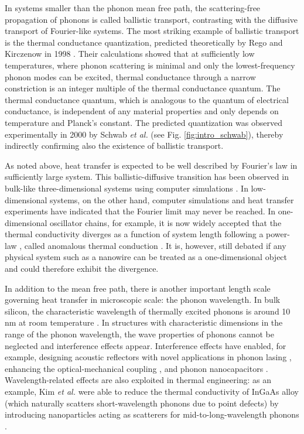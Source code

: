 In systems smaller than the phonon mean free path, the scattering-free propagation of phonons is called ballistic transport, contrasting with the diffusive transport of Fourier-like systems. The most striking example of ballistic transport is the thermal conductance quantization, predicted theoretically by Rego and Kirczenow in 1998 \cite{rego98}. Their calculations showed that at sufficiently low temperatures, where phonon scattering is minimal and only the lowest-frequency phonon modes can be excited, thermal conductance through a narrow constriction is an integer multiple of the thermal conductance quantum. The thermal conductance quantum, which is analogous to the quantum of electrical conductance, is independent of any material properties and only depends on temperature and Planck's constant. The predicted quantization was observed experimentally in 2000 by Schwab \textit{et al.} \cite{schwab00} (see Fig. \ref{fig:intro_schwab}), thereby indirectly confirming also the existence of ballistic transport.

As noted above, heat transfer is expected to be well described by Fourier's law in sufficiently large system. This ballistic-diffusive transition has been observed in bulk-like three-dimensional systems using computer simulations \cite{saito10}. In low-dimensional systems, on the other hand, computer simulations \cite{lepri97,lepri03,mai07,dhar08} and heat transfer experiments \cite{yang10,xu14} have indicated that the Fourier limit may never be reached. In one-dimensional oscillator chains, for example, it is now widely accepted \cite{dhar08} that the thermal conductivity diverges as a function of system length following a power-law \cite{mai07}, called anomalous thermal conduction \cite{dhar08}. It is, however, still debated \cite{marconnet13} if any physical system such as a nanowire can be treated as a one-dimensional object and could therefore exhibit the divergence.

In addition to the mean free path, there is another important length scale governing heat transfer in microscopic scale: the phonon wavelength. In bulk silicon, the characteristic wavelength of thermally excited phonons is around 10 nm at room temperature \cite{}. In structures with characteristic dimensions in the range of the phonon wavelength, the wave properties of phonons cannot be neglected and interference effects appear. Interference effects have enabled, for example, designing acoustic reflectors with novel applications in phonon lasing \cite{maryam13}, enhancing the optical-mechanical coupling \cite{fainstein13}, and phonon nanocapacitors \cite{han15}. Wavelength-related effects are also exploited in thermal engineering: as an example, Kim \textit{et al.} were able to reduce the thermal conductivity of InGaAs alloy (which naturally scatters short-wavelength phonons due to point defects) by introducing nanoparticles acting as scatterers for mid-to-long-wavelength phonons \cite{kim06}. %

